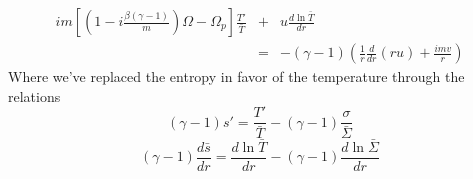\documentclass[apj]{emulateapj}
\begin{document}
\begin{eqnarray}  \label{eq:dtT}
i m \left[ \left( 1 - i \frac{\beta(\gamma -1)}{m} \right) \Omega - \Omega_p \right] \frac{T'}{\bar{T} } &+& u \frac{d  \ln \bar{T}}{d r}   \\ 
&=& -(\gamma -1)  \left( \frac{1}{r} \frac{d }{d r} ( r u) + \frac{ i m v}{r } \right) \nonumber
\end{eqnarray}
Where we've replaced the entropy in favor of the temperature through the relations
\begin{equation}
(\gamma -1)s' = \frac{ T'}{ \bar{T}} - (\gamma -1 ) \frac{ \sigma}{ \bar{\Sigma}} 
\end{equation}
\begin{equation}
(\gamma -1)\frac{d \bar{s}}{d r} = \frac{d \ln \bar{T}}{d r} - (\gamma -1) \frac{ d \ln \bar{\Sigma}}{d r} 
\end{equation}
\end{document}

